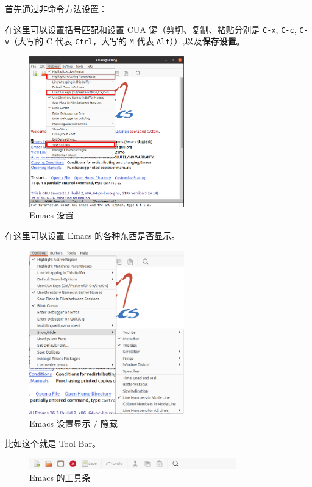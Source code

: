 \documentclass[UTF-8]{ctexart}
\begin{document}
				首先通过非命令方法设置：
				
				在这里可以设置括号匹配和设置 CUA 键（剪切、复制、粘贴分别是 \texttt{C-x}, \texttt{C-c}, \texttt{C-v}（大写的 C 代表 \texttt{Ctrl}，大写的 \texttt{M} 代表 \texttt{Alt}））,以及\textbf{\large 保存设置}。
				
				\begin{figure}[H]
					\centering
					\includegraphics[width=0.6\textwidth]{fig/emacs_options.png}
					\caption*{Emacs 设置}
				\end{figure}
			
				在这里可以设置 Emacs 的各种东西是否显示。
				
				\begin{figure}[H]
					\centering
					\includegraphics[width=0.6\textwidth]{fig/emacs_show_hide.png}
					\caption*{Emacs 设置显示 / 隐藏}
				\end{figure}
			
				比如这个就是 Tool Bar。
				
				\begin{figure}[H]
					\centering
					\includegraphics[width=0.8\textwidth]{fig/emacs_toolbar.png}
					\caption*{Emacs 的工具条}
				\end{figure}
			
\end{document}
